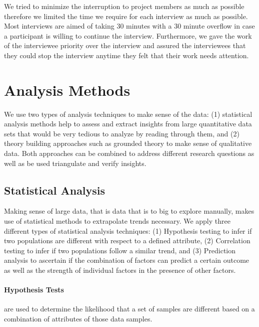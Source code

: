 We tried to minimize the interruption to project members as much as possible therefore we limited the time we require for each interview as much as possible.
Most interviews are aimed of taking 30 minutes with a 30 minute overflow in case a participant is willing to continue the interview.
Furthermore, we gave the work of the interviewee priority over the interview and assured the interviewees that they could stop the interview anytime they felt that their work needs attention.

\section{Analysis Methods}
\label{c5:sec:analysis}
We use two types of analysis techniques to make sense of the data: (1) statistical analysis methods help to assess and extract insights from large quantitative data sets that would be very tedious to analyze by reading through them, and (2) theory building approaches such as grounded theory to make sense of qualitative data.
Both approaches can be combined to address different research questions as well as be used triangulate and verify insights.

\subsection{Statistical Analysis}
Making sense of large data, that is data that is to big to explore manually, makes use of statistical methods to extrapolate trends necessary.
We apply three different types of statistical analysis techniques: (1) Hypothesis testing to infer if two populations are different with respect to a defined attribute, (2) Correlation testing to infer if two populations follow a similar trend, and (3) Prediction analysis to ascertain if the combination of factors can predict a certain outcome as well as the strength of individual factors in the presence of other factors. 

\paragraph{Hypothesis Tests} are used to determine the likelihood that a set of samples are different based on a combination of attributes of those data samples.

